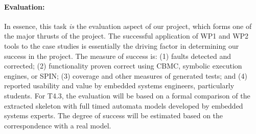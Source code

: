 \paragraph{Evaluation:} In essence, this task \emph{is} the evaluation
aspect of our project, which forms one of the major thrusts of the
project.  The successful application of WP1 and WP2 tools to the case
studies is essentially the driving factor in determining our success
in the project.
The measure of success is: (1) faults detected and corrected; (2)
functionality proven correct using CBMC, symbolic execution engines,
or SPIN; (3) coverage and other measures of generated tests; and (4)
reported usability and value by embedded systems engineers,
particularly students.  For T4.3, the evaluation will be based on a
formal comparison of the extracted skeleton with full timed automata
models developed by embedded systems experts. The degree of success
will be estimated based on the correspondence with a real model.



